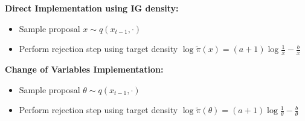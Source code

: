 \documentclass[12pt]{article}
\begin{document}
\bigskip
\noindent
\textbf{Direct Implementation using IG density:}
\begin{itemize}
\item Sample proposal $x \sim q(x_{t - 1}, \cdot)$
\item Perform rejection step using target density $\log \tilde{\pi}(x) = (a + 1)\log \frac{1}{x} - \frac{b}{x}$
\end{itemize}

\bigskip
\noindent
\textbf{Change of Variables Implementation:}
\begin{itemize}
\item Sample proposal $\theta \sim q(x_{t - 1}, \cdot)$
\item Perform rejection step using target density $\log \tilde{\pi}(\theta) = (a + 1) \log \frac{1}{\theta} - \frac{b}{\theta}$
\end{itemize}
\end{document}
